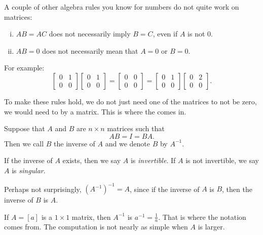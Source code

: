 A couple of other algebra rules you know for numbers do not quite
work on matrices:
\begin{enumerate}[(i)]
\item $AB = AC$ does not necessarily imply $B=C$, even if $A$ is not 0.
\item $AB = 0$ does not necessarily mean that $A=0$ or $B=0$.
\end{enumerate}
For example:
\begin{equation*}
\begin{bmatrix} 0 & 1 \\ 0 & 0 \end{bmatrix}
\begin{bmatrix} 0 & 1 \\ 0 & 0 \end{bmatrix}
=
\begin{bmatrix} 0 & 0 \\ 0 & 0 \end{bmatrix}
=
\begin{bmatrix} 0 & 1 \\ 0 & 0 \end{bmatrix}
\begin{bmatrix} 0 & 2 \\ 0 & 0 \end{bmatrix} .
\end{equation*}

To make these rules hold, we do not just need one of the matrices to not be zero,
we would need to  by
a matrix.  This is where the \emph{} comes in.

\begin{definition}
Suppose that $A$ and $B$ are $n \times n$ matrices such that
\begin{equation*}
AB = I = BA .
\end{equation*}
Then we call $B$ the inverse of $A$ and we denote $B$ by $A^{-1}$.

If the inverse of $A$ exists, then we say $A$ is
\emph{invertible}.
If $A$ is not invertible, we say $A$ is
\emph{singular}.
\end{definition}

Perhaps not surprisingly, ${(A^{-1})}^{-1} = A$, since if the inverse of $A$ 
is $B$, then the inverse of $B$ is $A$.

If $A = [a]$ is a $1 \times 1$ matrix, then $A^{-1}$ is $a^{-1} =
\frac{1}{a}$.  That is where the notation comes from.  The computation is not nearly as simple when $A$ is
larger.

